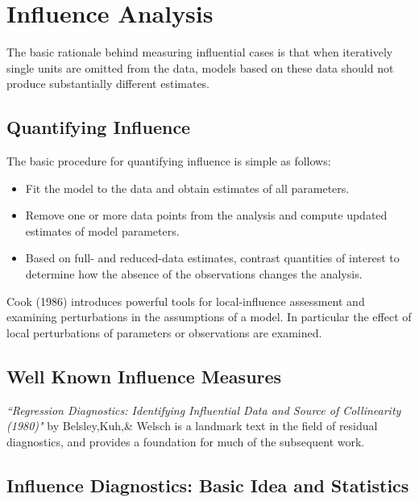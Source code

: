 \documentclass[12pt, a4paper]{report}
\begin{document}
\section*{Influence Analysis}
The basic rationale behind measuring influential cases is that when iteratively single units are omitted
from the data, models based on these data should not produce substantially different estimates.

\subsection{Quantifying Influence}  %

The basic procedure for quantifying influence is simple as follows:

\begin{itemize}
	\item Fit the model to the data and obtain estimates of all parameters.
	\item Remove one or more data points from the analysis and compute updated estimates of model parameters.
	\item Based on full- and reduced-data estimates, contrast quantities of interest to determine how the absence of the observations changes the analysis.
\end{itemize}

Cook (1986) introduces powerful tools for local-influence assessment and examining perturbations in the assumptions of a model. In particular the effect of local perturbations of parameters or observations are examined.	
\subsection{Well Known Influence Measures}

\textit{``Regression Diagnostics: Identifying Influential Data
	and Source of Collinearity (1980)"} by Belsley,Kuh,\& Welsch is a landmark text in the field of residual diagnostics, and
provides a foundation for much of the subsequent work.

\subsection{Influence Diagnostics: Basic Idea and Statistics} %

	
\end{document}
